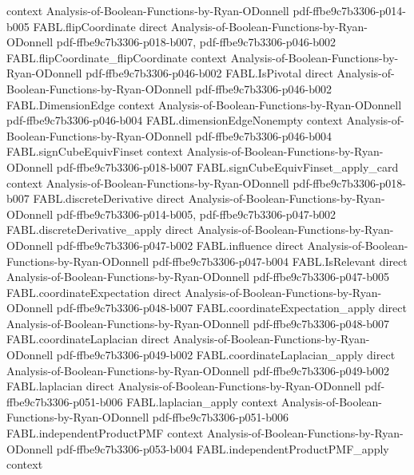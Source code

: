 \begin{theorem}
  {context}
  {Analysis-of-Boolean-Functions-by-Ryan-ODonnell}
  {pdf-ffbe9c7b3306-p014-b005}
\proofstep
  {FABL.flipCoordinate}
  {direct}
  {Analysis-of-Boolean-Functions-by-Ryan-ODonnell}
  {pdf-ffbe9c7b3306-p018-b007,
    pdf-ffbe9c7b3306-p046-b002}
\proofstep
  {FABL.flipCoordinate_flipCoordinate}
  {context}
  {Analysis-of-Boolean-Functions-by-Ryan-ODonnell}
  {pdf-ffbe9c7b3306-p046-b002}
\proofstep
  {FABL.IsPivotal}
  {direct}
  {Analysis-of-Boolean-Functions-by-Ryan-ODonnell}
  {pdf-ffbe9c7b3306-p046-b002}
\proofstep
  {FABL.DimensionEdge}
  {context}
  {Analysis-of-Boolean-Functions-by-Ryan-ODonnell}
  {pdf-ffbe9c7b3306-p046-b004}
\proofstep
  {FABL.dimensionEdgeNonempty}
  {context}
  {Analysis-of-Boolean-Functions-by-Ryan-ODonnell}
  {pdf-ffbe9c7b3306-p046-b004}
\proofstep
  {FABL.signCubeEquivFinset}
  {context}
  {Analysis-of-Boolean-Functions-by-Ryan-ODonnell}
  {pdf-ffbe9c7b3306-p018-b007}
\proofstep
  {FABL.signCubeEquivFinset_apply_card}
  {context}
  {Analysis-of-Boolean-Functions-by-Ryan-ODonnell}
  {pdf-ffbe9c7b3306-p018-b007}
\proofstep
  {FABL.discreteDerivative}
  {direct}
  {Analysis-of-Boolean-Functions-by-Ryan-ODonnell}
  {pdf-ffbe9c7b3306-p014-b005,
    pdf-ffbe9c7b3306-p047-b002}
\proofstep
  {FABL.discreteDerivative_apply}
  {direct}
  {Analysis-of-Boolean-Functions-by-Ryan-ODonnell}
  {pdf-ffbe9c7b3306-p047-b002}
\proofstep
  {FABL.influence}
  {direct}
  {Analysis-of-Boolean-Functions-by-Ryan-ODonnell}
  {pdf-ffbe9c7b3306-p047-b004}
\proofstep
  {FABL.IsRelevant}
  {direct}
  {Analysis-of-Boolean-Functions-by-Ryan-ODonnell}
  {pdf-ffbe9c7b3306-p047-b005}
\proofstep
  {FABL.coordinateExpectation}
  {direct}
  {Analysis-of-Boolean-Functions-by-Ryan-ODonnell}
  {pdf-ffbe9c7b3306-p048-b007}
\proofstep
  {FABL.coordinateExpectation_apply}
  {direct}
  {Analysis-of-Boolean-Functions-by-Ryan-ODonnell}
  {pdf-ffbe9c7b3306-p048-b007}
\proofstep
  {FABL.coordinateLaplacian}
  {direct}
  {Analysis-of-Boolean-Functions-by-Ryan-ODonnell}
  {pdf-ffbe9c7b3306-p049-b002}
\proofstep
  {FABL.coordinateLaplacian_apply}
  {direct}
  {Analysis-of-Boolean-Functions-by-Ryan-ODonnell}
  {pdf-ffbe9c7b3306-p049-b002}
\proofstep
  {FABL.laplacian}
  {direct}
  {Analysis-of-Boolean-Functions-by-Ryan-ODonnell}
  {pdf-ffbe9c7b3306-p051-b006}
\proofstep
  {FABL.laplacian_apply}
  {context}
  {Analysis-of-Boolean-Functions-by-Ryan-ODonnell}
  {pdf-ffbe9c7b3306-p051-b006}
\proofstep
  {FABL.independentProductPMF}
  {context}
  {Analysis-of-Boolean-Functions-by-Ryan-ODonnell}
  {pdf-ffbe9c7b3306-p053-b004}
\proofstep
  {FABL.independentProductPMF_apply}
  {context}

\end{theorem}
